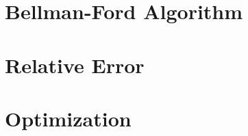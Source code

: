 \documentclass[11pt]{article}
\begin{document}
\section{Bellman-Ford Algorithm}

\section{Relative Error}

\section{Optimization}

\begin{thebibliography}{9}


\end{thebibliography}
\end{document}
